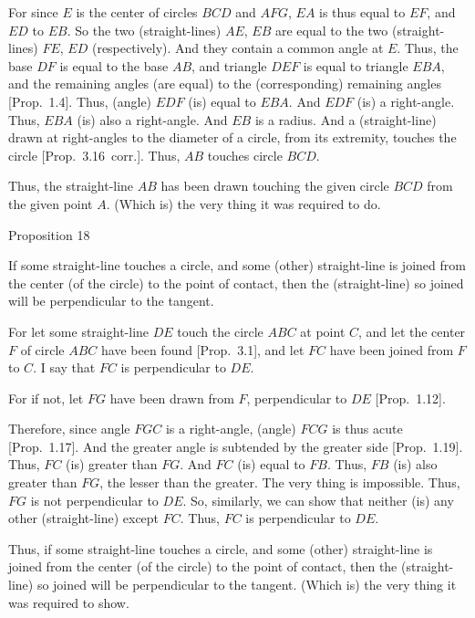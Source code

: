 For since $E$ is the center of circles $BCD$ and $AFG$, $EA$ is thus equal to $EF$,
and $ED$ to $EB$. So the two (straight-lines) $AE$, $EB$ are equal to
the two (straight-lines) $FE$, $ED$ (respectively). And they contain a common angle at $E$.
Thus, the base $DF$ is equal to the base $AB$, and triangle $DEF$ is equal to
triangle $EBA$, and the remaining angles (are equal) to the (corresponding)
remaining angles [Prop.~1.4]. Thus, (angle) $EDF$ (is) equal to $EBA$. And
$EDF$ (is) a right-angle. Thus, $EBA$ (is) also a right-angle. And $EB$ is a radius.
And a (straight-line) drawn at right-angles to the diameter of a circle, from
its extremity,  touches the circle [Prop.~3.16~corr.]. Thus, $AB$ touches circle $BCD$.

Thus, the straight-line $AB$ has been drawn touching the given circle $BCD$ from the given point $A$. (Which is) the very thing it was required to do.


\begin{center}
{\large Proposition 18}
\end{center}

If some straight-line touches a circle, and some (other) straight-line is
joined from the center (of the circle) to the point of contact, then the (straight-line)
so joined will be perpendicular to the tangent.

\epsfysize=2.2in
\centerline{}

For let some straight-line $DE$  touch the circle $ABC$  at  point $C$, and
let the center $F$ of circle $ABC$ have been found [Prop.~3.1], 
and let $FC$ have been joined from $F$ to $C$. I say that $FC$ is perpendicular
to $DE$.

For if not, let $FG$ have been drawn from $F$, perpendicular to $DE$ [Prop.~1.12].

Therefore, since angle $FGC$ is a right-angle, (angle) $FCG$ is thus acute [Prop.~1.17]. And the greater angle is subtended by the greater side [Prop.~1.19]. Thus, $FC$ (is) greater than $FG$. And $FC$ (is) equal to
$FB$. Thus, $FB$ (is)  also greater than $FG$, the lesser than the greater.
The very thing is impossible. Thus, $FG$ is not perpendicular to
$DE$. So, similarly, we can show that neither (is) any other
(straight-line) except $FC$. Thus, $FC$ is perpendicular  to $DE$.

Thus, if some straight-line  touches a circle, and some (other) straight-line is
joined from the center (of the circle) to the point of contact, then the (straight-line)
so joined will be perpendicular to the tangent. (Which is)
the very thing it was required to show.

